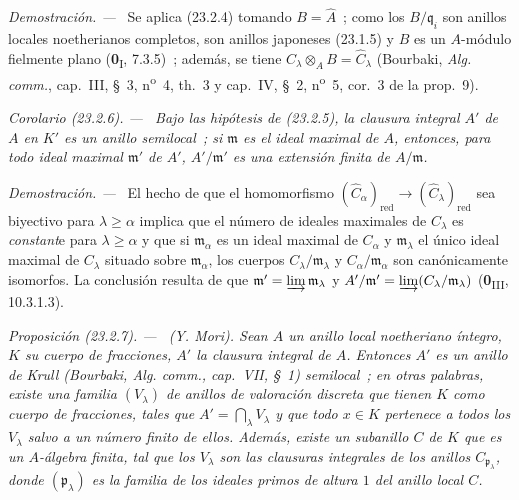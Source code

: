 \documentclass[10pt,oneside]{book}
\makeatletter
\newcommand{\setmanualcurrentlabel}[1]{\def\@currentlabel{#1}}
\newcommand{\oldpage}[2][]{%
  \setcounter{footnote}{0}%
  \marginpar{\scriptsize\textbf{#1}~|~#2}\ignorespaces}
\newenvironment{proposition}[1][]{%
  \setmanualcurrentlabel{#1}\par\medskip\noindent\itshape Proposición (#1). ---\ }{\par}
\newenvironment{corollary}[1][]{%
  \setmanualcurrentlabel{#1}\par\medskip\noindent\itshape Corolario (#1). ---\ }{\par}
\newenvironment{proof}{%
  \par\medskip\noindent\textit{Demostración. ---\ }}{\par}
\makeatother
\begin{document}
\oldpage[0\textsubscript{IV-1}]{219}

\begin{proof}
Se aplica (23.2.4) tomando $B=\widehat A$~; como los
$B/\mathfrak q_i$ son anillos locales noetherianos completos, son anillos
japoneses (23.1.5) y $B$ es un $A$-módulo fielmente plano
(\textbf{0}\textsubscript{I}, 7.3.5)~; además, se tiene
$C_\lambda\otimes_AB=\widehat C_\lambda$ (Bourbaki, \emph{Alg. comm.},
cap.~III, §~3, n\textsuperscript{o}~4, th.~3 y cap.~IV, §~2,
n\textsuperscript{o}~5, cor.~3 de la prop.~9).
\end{proof}

\begin{corollary}[23.2.6]
\label{0.23.2.6-es}
Bajo las hipótesis de \textup{(23.2.5)}, la clausura integral $A'$ de $A$ en
$K'$ es un anillo semilocal~; si $\mathfrak m$ es el ideal maximal de $A$,
entonces, para todo ideal maximal $\mathfrak m'$ de $A'$,
$A'/\mathfrak m'$ es una extensión finita de $A/\mathfrak m$.
\end{corollary}

\begin{proof}
El hecho de que el homomorfismo
$(\widehat C_\alpha)_{\mathrm{red}}\to
(\widehat C_\lambda)_{\mathrm{red}}$ sea biyectivo para
$\lambda\geqslant\alpha$ implica que el número de ideales maximales de
$C_\lambda$ es \emph{constant}e para $\lambda\geqslant\alpha$ y que si
$\mathfrak m_\alpha$ es un ideal maximal de $C_\alpha$ y
$\mathfrak m_\lambda$ el único ideal maximal de $C_\lambda$ situado sobre
$\mathfrak m_\alpha$, los cuerpos $C_\lambda/\mathfrak m_\lambda$ y
$C_\alpha/\mathfrak m_\alpha$ son canónicamente isomorfos. La conclusión
resulta de que $\mathfrak m'=\varinjlim\mathfrak m_\lambda$ y
$A'/\mathfrak m'=\varinjlim(C_\lambda/\mathfrak m_\lambda)$
(\textbf{0}\textsubscript{III}, 10.3.1.3).
\end{proof}

\begin{proposition}[23.2.7]
\label{0.23.2.7-es}
\textnormal{(Y. Mori).} Sean $A$ un anillo local noetheriano íntegro, $K$ su
cuerpo de fracciones, $A'$ la clausura integral de $A$. Entonces $A'$ es un
anillo de Krull \textup{(Bourbaki, \emph{Alg. comm.}, cap.~VII, §~1)} semilocal~;
en otras palabras, existe una familia $(V_\lambda)$ de anillos de valoración
discreta que tienen $K$ como cuerpo de fracciones, tales que
$A'=\bigcap_\lambda V_\lambda$ y que todo $x\in K$ pertenece a todos los
$V_\lambda$ salvo a un número finito de ellos. Además, existe un
subanillo $C$ de $K$ que es un $A$-álgebra finita, tal que los
$V_\lambda$ son las clausuras integrales de los anillos
$C_{\mathfrak p_\lambda}$, donde $(\mathfrak p_\lambda)$ es la familia de los
ideales primos de altura $1$ del anillo local $C$.
\end{proposition}
\end{document}
